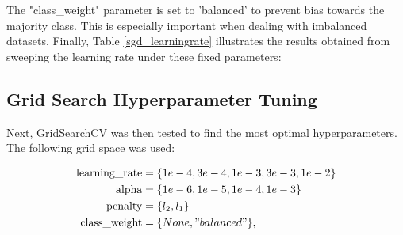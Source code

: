 The "class\_weight" parameter is set to 'balanced' to prevent bias towards the majority class. This is especially important when dealing with imbalanced datasets. 
Finally, Table \ref{sgd_learningrate} illustrates the results obtained from sweeping the learning rate under these fixed parameters:

\begin{table}[htbp]
\caption{Learning-rate Sweep Results}
\centering
{}
\label{sgd_learningrate}
\end{table}

\subsection{Grid Search Hyperparameter Tuning}\label{gridsearch_section}

Next, GridSearchCV was then tested to find the most optimal hyperparameters. The following grid space was used:

\[
\begin{aligned}
\text{learning\_rate} &= \{1e-4, 3e-4, 1e-3, 3e-3, 1e-2\} \\
\text{alpha} &= \{1e-6, 1e-5, 1e-4, 1e-3\} \\
\text{penalty} &= \{l_2, l_1\} \\
\text{class\_weight} &= \{None, "balanced"\},
\end{aligned}
\]

